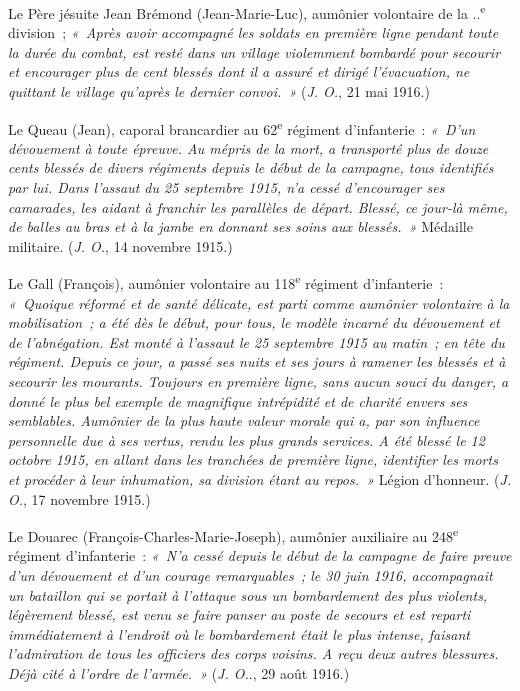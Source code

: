 \documentclass[french,twoside]{book} %
\begin{document}
Le Père jésuite Jean Brémond (Jean-Marie-Luc), aumônier volontaire de la ..\textsuperscript{e} division ; \emph{« Après avoir accompagné les soldats en première ligne pendant toute la durée du combat, est resté dans un village violemment bombardé pour secourir et encourager plus de cent blessés dont il a assuré et dirigé l’évacuation, ne quittant le village qu’après le dernier convoi. »} ({\itshape J. O.}, 21 mai 1916.)‌\par
Le Queau (Jean), caporal brancardier au 62\textsuperscript{e} régiment d’infanterie : \emph{« D’un dévouement à toute épreuve. Au mépris de la mort, a transporté plus de douze cents blessés de divers régiments depuis le début de la campagne, tous identifiés par lui. Dans l’assaut du 25 septembre 1915, n’a cessé d’encourager ses camarades, les aidant à franchir les parallèles de départ. Blessé, ce jour-là même, de balles au bras et à la jambe en donnant ses soins aux blessés. »} Médaille militaire. ({\itshape J. O.}, 14 novembre 1915.)‌\par
Le Gall (François), aumônier volontaire au 118\textsuperscript{e} régiment d’infanterie : \emph{« Quoique réformé et de santé délicate, est parti comme aumônier volontaire à la mobilisation ; a été dès le début, pour tous, le modèle incarné du dévouement et de l’abnégation. Est monté à l’assaut le 25 septembre 1915 au matin ; en tête du régiment. Depuis ce jour, a passé ses nuits et ses jours à ramener les blessés et à secourir les mourants. Toujours en première ligne, sans aucun souci du danger, a donné le plus bel exemple de magnifique intrépidité et de charité envers ses semblables. Aumônier de la plus haute valeur morale qui a, par son influence personnelle due à ses vertus, rendu les plus grands services. A été blessé le 12 octobre 1915, en allant dans les tranchées de première ligne, identifier les morts et procéder à leur inhumation, sa division étant au repos. »} Légion d’honneur. ({\itshape J. O.}, 17 novembre 1915.)‌\par
Le Douarec (François-Charles-Marie-Joseph), aumônier auxiliaire au 248\textsuperscript{e} régiment d’infanterie : \emph{« N’a cessé depuis le début de la campagne de faire preuve d’un dévouement et d’un courage remarquables ; le 30 juin 1916, accompagnait un bataillon qui se portait à l’attaque sous un bombardement des plus violents, légèrement blessé, est venu se faire panser au poste de secours et est reparti immédiatement à l’endroit où le bombardement était le plus intense, faisant l’admiration de tous les officiers des corps voisins. A reçu deux autres blessures. Déjà cité à l’ordre de l’armée. »} ({\itshape J. O.}., 29 août 1916.)‌\par
\end{document}
